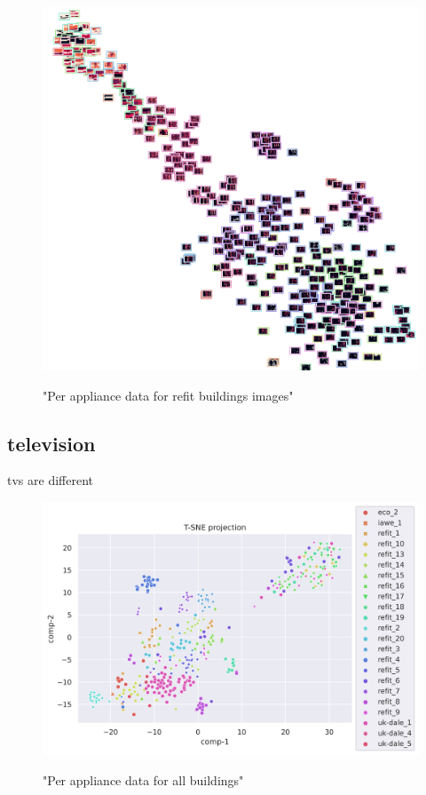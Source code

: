 \begin{figure}[H]
	\centering
	\caption{"Per appliance data for refit buildings images"}
	\includegraphics[width=.9\textwidth]{Figures/TSNE/TSNE_per_appliance/all/img_scatter_allmicrowave.png}
	\label{fig:tsne_pa_img_scatter_all_microwave}
\end{figure}

\subsection{television}
tvs are different

\begin{figure}[H]
	\centering
	\caption{"Per appliance data for all buildings"}
	\includegraphics[width=1.2\textwidth]{Figures/TSNE/TSNE_per_appliance/all/scatter_all_television.png}
	\label{fig:tsne_pa_scatter_all_tv}
\end{figure}

